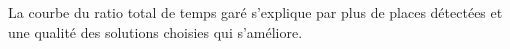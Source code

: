La courbe du ratio total de temps garé s'explique par plus de places détectées et une qualité des solutions choisies qui s'améliore.

\begin{figure}
  \begin{center}
    
    

\end{center}
\end{figure}

